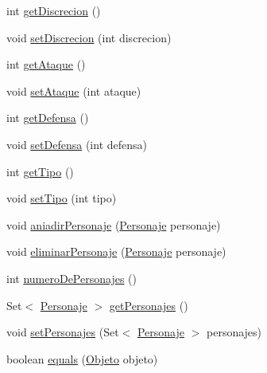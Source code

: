 \begin{DoxyCompactItemize}
\item 
int \hyperlink{classes_1_1deusto_1_1spq_1_1_t_e_scc_1_1servidor_1_1jdo_1_1_objeto_a6b8cc4c28ba9cac790830d16cea7f6ed}{get\+Discrecion} ()
\item 
void \hyperlink{classes_1_1deusto_1_1spq_1_1_t_e_scc_1_1servidor_1_1jdo_1_1_objeto_a356a151fe13b62442cccedc64d314c20}{set\+Discrecion} (int discrecion)
\item 
int \hyperlink{classes_1_1deusto_1_1spq_1_1_t_e_scc_1_1servidor_1_1jdo_1_1_objeto_a6341bc39a45e9ecdf395ffe103b82531}{get\+Ataque} ()
\item 
void \hyperlink{classes_1_1deusto_1_1spq_1_1_t_e_scc_1_1servidor_1_1jdo_1_1_objeto_ad6ce4904119eb800f3a1c0c24250a6f5}{set\+Ataque} (int ataque)
\item 
int \hyperlink{classes_1_1deusto_1_1spq_1_1_t_e_scc_1_1servidor_1_1jdo_1_1_objeto_a5ec769efb59a2a1dc55144eaba73b311}{get\+Defensa} ()
\item 
void \hyperlink{classes_1_1deusto_1_1spq_1_1_t_e_scc_1_1servidor_1_1jdo_1_1_objeto_ae1c7efccb2567e4e472a61b323491141}{set\+Defensa} (int defensa)
\item 
int \hyperlink{classes_1_1deusto_1_1spq_1_1_t_e_scc_1_1servidor_1_1jdo_1_1_objeto_ab8772c99abed2a763eb343cd6c238414}{get\+Tipo} ()
\item 
void \hyperlink{classes_1_1deusto_1_1spq_1_1_t_e_scc_1_1servidor_1_1jdo_1_1_objeto_acccbde3b5d80065e203cb6677830a247}{set\+Tipo} (int tipo)
\item 
void \hyperlink{classes_1_1deusto_1_1spq_1_1_t_e_scc_1_1servidor_1_1jdo_1_1_objeto_a9c7cfca0877b8dd023ca3833ccb5f7f6}{aniadir\+Personaje} (\hyperlink{classes_1_1deusto_1_1spq_1_1_t_e_scc_1_1servidor_1_1jdo_1_1_personaje}{Personaje} personaje)
\item 
void \hyperlink{classes_1_1deusto_1_1spq_1_1_t_e_scc_1_1servidor_1_1jdo_1_1_objeto_a44dc9a7acce28cfd24a646d47fd7876c}{eliminar\+Personaje} (\hyperlink{classes_1_1deusto_1_1spq_1_1_t_e_scc_1_1servidor_1_1jdo_1_1_personaje}{Personaje} personaje)
\item 
int \hyperlink{classes_1_1deusto_1_1spq_1_1_t_e_scc_1_1servidor_1_1jdo_1_1_objeto_a5fbc1d7943fd58c723ef15d0899c0dfa}{numero\+De\+Personajes} ()
\item 
Set$<$ \hyperlink{classes_1_1deusto_1_1spq_1_1_t_e_scc_1_1servidor_1_1jdo_1_1_personaje}{Personaje} $>$ \hyperlink{classes_1_1deusto_1_1spq_1_1_t_e_scc_1_1servidor_1_1jdo_1_1_objeto_ae18ab1ecc2cf933e9ed3a5adc29a80a7}{get\+Personajes} ()
\item 
void \hyperlink{classes_1_1deusto_1_1spq_1_1_t_e_scc_1_1servidor_1_1jdo_1_1_objeto_a5790799c8cf861591bc3257e0962c8b8}{set\+Personajes} (Set$<$ \hyperlink{classes_1_1deusto_1_1spq_1_1_t_e_scc_1_1servidor_1_1jdo_1_1_personaje}{Personaje} $>$ personajes)
\item 
boolean \hyperlink{classes_1_1deusto_1_1spq_1_1_t_e_scc_1_1servidor_1_1jdo_1_1_objeto_a2c4d0e2bb5773c8fc67b4705887b9416}{equals} (\hyperlink{classes_1_1deusto_1_1spq_1_1_t_e_scc_1_1servidor_1_1jdo_1_1_objeto}{Objeto} objeto)
\end{DoxyCompactItemize}
